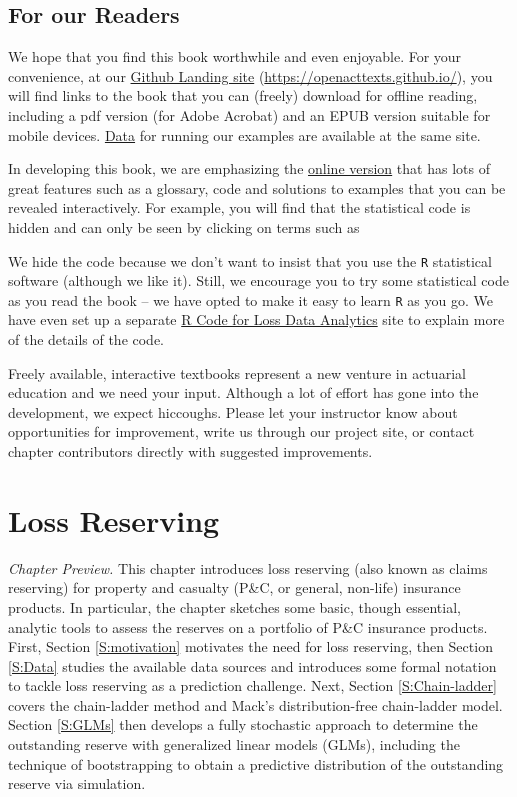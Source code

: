 \documentclass[]{book}
\begin{document}
\section*{For our Readers}\label{for-our-readers}

We hope that you find this book worthwhile and even enjoyable. For your
convenience, at our \href{https://openacttexts.github.io/}{Github
Landing site} (\url{https://openacttexts.github.io/}), you will find
links to the book that you can (freely) download for offline reading,
including a pdf version (for Adobe Acrobat) and an EPUB version suitable
for mobile devices.
\href{https://github.com/OpenActTexts/Loss-Data-Analytics/tree/master/Data}{Data}
for running our examples are available at the same site.

In developing this book, we are emphasizing the
\href{https://openacttexts.github.io/Loss-Data-Analytics/index.html}{online
version} that has lots of great features such as a glossary, code and
solutions to examples that you can be revealed interactively. For
example, you will find that the statistical code is hidden and can only
be seen by clicking on terms such as

We hide the code because we don't want to insist that you use the
\texttt{R} statistical software (although we like it). Still, we
encourage you to try some statistical code as you read the book -- we
have opted to make it easy to learn \texttt{R} as you go. We have even
set up a separate \href{https://openacttexts.github.io/LDARcode}{R Code
for Loss Data Analytics} site to explain more of the details of the
code.

Freely available, interactive textbooks represent a new venture in
actuarial education and we need your input. Although a lot of effort has
gone into the development, we expect hiccoughs. Please let your
instructor know about opportunities for improvement, write us through
our project site, or contact chapter contributors directly with
suggested improvements.

\chapter{Loss Reserving}\label{C:LossReserves}

\emph{Chapter Preview.} This chapter introduces loss reserving (also
known as claims reserving) for property and casualty (P\&C, or general,
non-life) insurance products. In particular, the chapter sketches some
basic, though essential, analytic tools to assess the reserves on a
portfolio of P\&C insurance products. First, Section \ref{S:motivation}
motivates the need for loss reserving, then Section \ref{S:Data} studies
the available data sources and introduces some formal notation to tackle
loss reserving as a prediction challenge. Next, Section
\ref{S:Chain-ladder} covers the chain-ladder method and Mack's
distribution-free chain-ladder model. Section \ref{S:GLMs} then develops
a fully stochastic approach to determine the outstanding reserve with
generalized linear models (GLMs), including the technique of
bootstrapping to obtain a predictive distribution of the outstanding
reserve via simulation.
\end{document}
